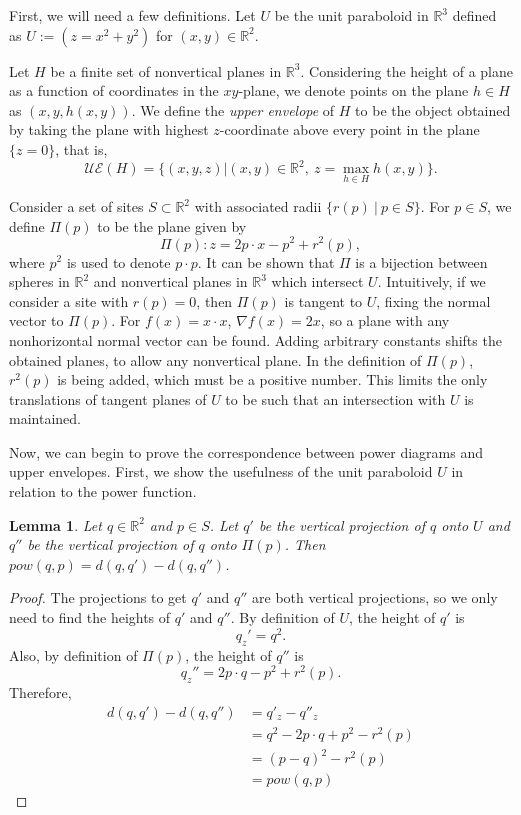 \documentclass[a4paper, 11pt]{article}
\newtheorem{lemma}{Lemma}[section]
\newcommand{\R}{\mathbb{R}}
\begin{document}
First, we will need a few definitions. Let $U$ be the unit paraboloid in $\R^3$ defined as $U := (z = x^2 + y^2)$ for $(x,y) \in \R^2$.

Let $H$ be a finite set of nonvertical planes in $\R^3$. Considering the height of a plane as a function of coordinates in the $xy$-plane, we denote points
on the plane $h \in H$ as $(x,y,h(x,y))$. We define the \textit{upper envelope} of $H$ to be the object obtained by taking the plane with highest
$z$-coordinate above every point in the plane $\{ z = 0 \}$, that is,
\[ \mathcal{UE}(H) = \{ (x,y,z) | (x,y) \in \R^2, \ z = \max_{h \in H} h(x,y) \} .\]

Consider a set of sites $S \subset \R^2$ with associated radii $\{r(p) \ | \ p \in S\}$. For $p \in S$, we define $\Pi(p)$ to be the plane given by
\[ \Pi(p) : z = 2 p \cdot x - p^2 + r^2(p) ,\]
where $p^2$ is used to denote $p \cdot p$. It can be shown that $\Pi$ is a bijection between spheres in $\R^2$ and nonvertical planes in $\R^3$ which
intersect $U$. Intuitively, if we consider a site with $r(p) = 0$, then $\Pi(p)$ is tangent to $U$, fixing the normal vector to $\Pi(p)$. For $f(x) =
x \cdot x$, $\nabla f(x) = 2x$, so a plane with any nonhorizontal normal vector can be found. Adding arbitrary constants shifts the obtained planes, to allow any
nonvertical plane. In the definition of $\Pi(p)$, $r^2(p)$ is being added, which must be a positive number. This limits the only translations of
tangent planes of $U$ to be such that an intersection with $U$ is maintained.

Now, we can begin to prove the correspondence between power diagrams and upper envelopes. First, we show the usefulness of the unit paraboloid $U$ in
relation to the power function.

\begin{lemma}
  \label{lem:proj}
  Let $q \in \R^2$ and $p \in S$. Let $q'$ be the vertical projection of $q$ onto $U$ and $q''$ be the vertical projection of $q$ onto $\Pi(p)$. Then
  $pow(q, p) = d(q, q') - d(q, q'')$.
\end{lemma}
\begin{proof}
  The projections to get $q'$ and $q''$ are both vertical projections, so we only need to find the heights of $q'$ and $q''$. By
  definition of $U$, the height of $q'$ is
  \[ q_z' = q^2.\]
  Also, by definition of $\Pi(p)$, the height of $q''$ is
  \[ q_z'' = 2p \cdot q - p^2 + r^2(p) . \]
  Therefore,
  \begin{align*}
    d(q,q') - d(q,q'') &= q'_z - q''_z \\
    &= q^2 - 2 p \cdot q + p^2 - r^2(p) \\
    &= (p-q)^2 - r^2(p) \\
    &= pow(q,p)
  \end{align*}
\end{proof}
\end{document}
